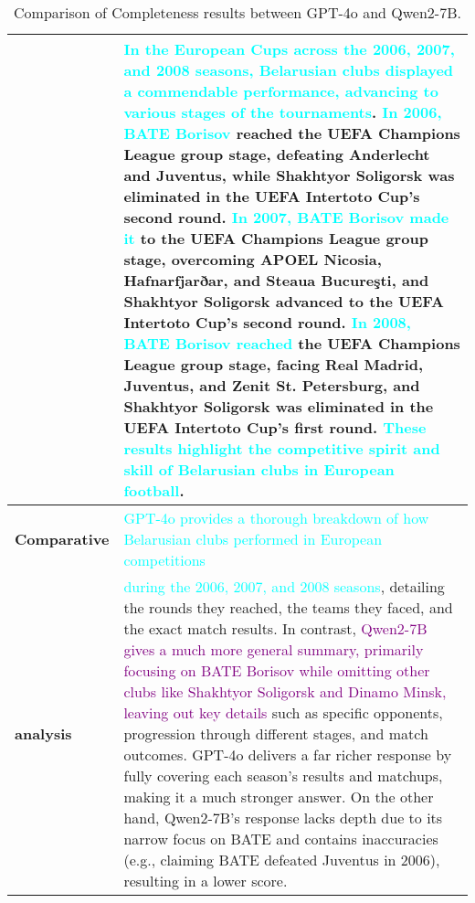 \begin{table*}[htbp]
\begin{small}
\begin{tabularx}{\textwidth}{%
>{\arraybackslash}p{}
>{\arraybackslash}X
}
& \textcolor{cyan}{In the European Cups across the 2006, 2007, and 2008 seasons, Belarusian clubs displayed a commendable performance, advancing to various stages of the tournaments}. \textcolor{cyan}{In 2006, BATE Borisov} reached the UEFA Champions League group stage, defeating Anderlecht and Juventus, while Shakhtyor Soligorsk was eliminated in the UEFA Intertoto Cup's second round. \textcolor{cyan}{In 2007, BATE Borisov made it} to the UEFA Champions League group stage, overcoming APOEL Nicosia, Hafnarfjarðar, and Steaua Bucureşti, and Shakhtyor Soligorsk advanced to the UEFA Intertoto Cup's second round. \textcolor{cyan}{In 2008, BATE Borisov reached} the UEFA Champions League group stage, facing Real Madrid, Juventus, and Zenit St. Petersburg, and Shakhtyor Soligorsk was eliminated in the UEFA Intertoto Cup's first round. \textcolor{cyan}{These results highlight the competitive spirit and skill of Belarusian clubs in European football}. \\ \midrule
\textbf{Comparative}
& \textcolor{cyan}{GPT-4o provides a thorough breakdown of how Belarusian clubs performed in European competitions} \\
\textbf{analysis}
& \textcolor{cyan}{during the 2006, 2007, and 2008 seasons}, detailing the rounds they reached, the teams they faced, and the exact match results. In contrast, \textcolor{purple}{Qwen2-7B gives a much more general summary, primarily focusing on BATE Borisov while omitting other clubs like Shakhtyor Soligorsk and Dinamo Minsk, leaving out key details} such as specific opponents, progression through different stages, and match outcomes. GPT-4o delivers a far richer response by fully covering each season’s results and matchups, making it a much stronger answer. On the other hand, Qwen2-7B’s response lacks depth due to its narrow focus on BATE and contains inaccuracies (e.g., claiming BATE defeated Juventus in 2006), resulting in a lower score. \\
\bottomrule
\end{tabularx}
\end{small}
\caption{Comparison of \eval Completeness results between GPT-4o and Qwen2-7B.}
\label{case:comparison_ii}
\end{table*}
